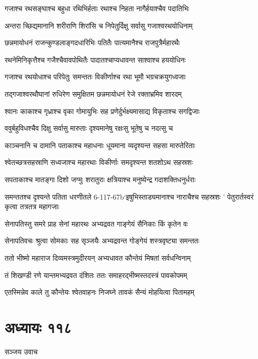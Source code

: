 \twolineshloka
{गजाश्च रथसङ्घाश्च बहुधा रथिभिर्हताः}
{रथाश्च निहता नागैर्हयाश्चैव पदातिभिः}


\twolineshloka
{अन्तरा च्छिद्यमानानि शरीराणि शिरांसि च}
{निपेतुर्दिक्षु सर्वासु गजाश्वरथयोधिनाम्}


\twolineshloka
{छन्नमायोधनं राजन्कुण्डलाङ्गदधारिभिः}
{पतितैः पात्यमानैश्च राजपुत्रैर्महारथैः}


\twolineshloka
{रथनेमिनिकृत्तैश्च गजैश्चैवावपोथितैः}
{पादातश्चाप्यधावन्त साश्वाश्च हययोधिनः}


\twolineshloka
{गजाश्च रथयोधाश्च परिपेतुः समन्ततः}
{विकीर्णाश्च रथा भूमौ भग्रचक्रयुगध्वजाः}


\twolineshloka
{तद्गजाश्वरथौघानां रुधिरेण समुक्षितम}
{छन्नमायोधनं रेजे रक्ताभ्रमिव शारदम्}


\twolineshloka
{श्वानः काकाश्च गृध्राश्च वृका गोमायुभिः सह}
{प्रणेर्दुर्भक्ष्यमासाद्य विकृताश्च सगद्विजाः}


\twolineshloka
{ववुर्बहुविधश्चैव दिक्षु सर्वासु मारुताः}
{दृश्यमानेषु रक्षःसु भूतेषु च नदत्सु च}


\twolineshloka
{काञ्चनानि च दामानि पताकाश्च महाधनाः}
{धूयमाना व्यदृश्यन्त सहसा मारुतेरिताः}


\twolineshloka
{श्वेतच्छत्रसहस्राणि सध्वजाश्च महारथाः}
{विकीर्णाः समदृश्यन्त शतशोऽथ सहस्रशः}


\twolineshloka
{सपताकाश्च मातङ्गा दिशो जग्मुः शरातुराः}
{क्षत्रियाश्च मनुष्येन्द्र गदाशक्तिधनुर्धराः}


\threelineshloka
{समन्ततश्च दृश्यन्ते पतिता धरणीतले}
{6-117-67b`इषुभिस्ताड्यमानाश्च नाराचैश्च सहस्रशः}
{' पेतुरार्तस्वरं कृत्वा तत्रतत्र महागजाः}


\twolineshloka
{सेनापतिस्तु समरे प्राह सेनां महारथः}
{अभ्यद्रवत गाङ्गेयं सैनिकाः किं कृतेन वः}


\twolineshloka
{सेनापतिवचः श्रुत्वा सोमकाः सह सृञ्जयैः}
{अभ्यद्रवन्त गोङ्गेयं शस्त्रवृष्ट्या समन्ततः}


\twolineshloka
{ततो भीष्मो महाराज दिव्यमस्त्रमुदीरयन्}
{अभ्यधावत कौन्तेयं मिषतां सर्वधन्विनाम्}


\twolineshloka
{तं शिखण्डी रणे यान्तमभ्यद्रवत दंशितः}
{ततः समाहरद्भीष्मस्तदस्त्रं पावकोपमम्}


\twolineshloka
{एतस्मिन्नेव काले तु कौन्तेयः श्वेतवाहनः}
{निजघ्ने तावकं सैन्यं मोहयित्वा पितामहम्}


\chapter{अध्यायः ११८}
\twolineshloka
{सञ्जय उवाच}
{}


